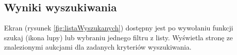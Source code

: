 \documentclass[a4paper,twoside,titlepage,openright]{book}
\begin{document}
\subsection{Wyniki wyszukiwania}
Ekran (rysunek \ref{fig:listaWyszukanych}) dostępny jest po wywołaniu funkcji szukaj (ikona lupy) lub wybraniu jednego filtru z listy. Wyświetla stronę ze znalezionymi aukcjami dla zadanych kryteriów wyszukiwania.

\begin{figure}[h]
	\centering
	\begin{minipage}[t]{0.3\textwidth}
		\setlength{\fboxsep}{1pt}

\end{minipage}
\end{figure}
\end{document}
